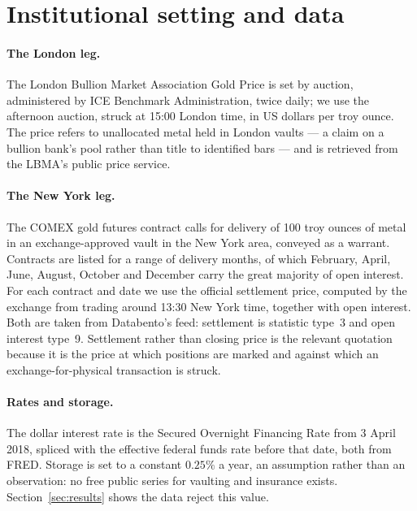 \documentclass[11pt,a4paper]{article}
\begin{document}
\section{Institutional setting and data}
\label{sec:data}

\paragraph{The London leg.}
The London Bullion Market Association Gold Price is set by auction, administered
by ICE Benchmark Administration, twice daily; we use the afternoon auction,
struck at 15:00 London time, in US dollars per troy ounce. The price refers to
unallocated metal held in London vaults --- a claim on a bullion bank's pool
rather than title to identified bars --- and is retrieved from the LBMA's
public price service.

\paragraph{The New York leg.}
The COMEX gold futures contract calls for delivery of 100 troy ounces of metal
in an exchange-approved vault in the New York area, conveyed as a warrant.
Contracts are listed for a range of delivery months, of which February, April,
June, August, October and December carry the great majority of open interest.
For each contract and date we use the official settlement price, computed by
the exchange from trading around 13:30 New York time, together with open
interest. Both are taken from Databento's  feed: settlement is
statistic type~3 and open interest type~9. Settlement rather than closing price
is the relevant quotation because it is the price at which positions are
marked and against which an exchange-for-physical transaction is struck.

\paragraph{Rates and storage.}
The dollar interest rate is the Secured Overnight Financing Rate from 3 April
2018, spliced with the effective federal funds rate before that date, both from
FRED. Storage is set to a constant $0.25\%$ a year, an assumption rather than
an observation: no free public series for vaulting and insurance exists.
Section~\ref{sec:results} shows the data reject this value.
\end{document}
